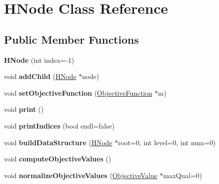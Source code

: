 \hypertarget{classHNode}{\section{H\-Node Class Reference}
\label{classHNode}
}
\subsection*{Public Member Functions}
\begin{DoxyCompactItemize}
\item 
\hypertarget{classHNode_abdd79609f34c6318445bc4dee03f34d2}{{\bfseries H\-Node} (int index=-\/1)}\label{classHNode_abdd79609f34c6318445bc4dee03f34d2}

\item 
\hypertarget{classHNode_ad17d7be7f28d433db5d7c1b8f61aca39}{void {\bfseries add\-Child} (\hyperlink{classHNode}{H\-Node} $\ast$node)}\label{classHNode_ad17d7be7f28d433db5d7c1b8f61aca39}

\item 
\hypertarget{classHNode_a829d5b0388867bff02e414f73c545ea0}{void {\bfseries set\-Objective\-Function} (\hyperlink{classObjectiveFunction}{Objective\-Function} $\ast$m)}\label{classHNode_a829d5b0388867bff02e414f73c545ea0}

\item 
\hypertarget{classHNode_a00d9c439d12421fda1aecfd06411d4ec}{void {\bfseries print} ()}\label{classHNode_a00d9c439d12421fda1aecfd06411d4ec}

\item 
\hypertarget{classHNode_ad5c92795c03295d891545d435cf4ea64}{void {\bfseries print\-Indices} (bool endl=false)}\label{classHNode_ad5c92795c03295d891545d435cf4ea64}

\item 
\hypertarget{classHNode_a05fa5672b3c4dde3a8b9686ee91aca2f}{void {\bfseries build\-Data\-Structure} (\hyperlink{classHNode}{H\-Node} $\ast$root=0, int level=0, int num=0)}\label{classHNode_a05fa5672b3c4dde3a8b9686ee91aca2f}

\item 
\hypertarget{classHNode_a405e9125ac0e08eb6e05a8743ca5be86}{void {\bfseries compute\-Objective\-Values} ()}\label{classHNode_a405e9125ac0e08eb6e05a8743ca5be86}

\item 
\hypertarget{classHNode_a805a676e4362d92aa61947792b5b6afa}{void {\bfseries normalize\-Objective\-Values} (\hyperlink{classObjectiveValue}{Objective\-Value} $\ast$max\-Qual=0)}\label{classHNode_a805a676e4362d92aa61947792b5b6afa}


\end{DoxyCompactItemize}
